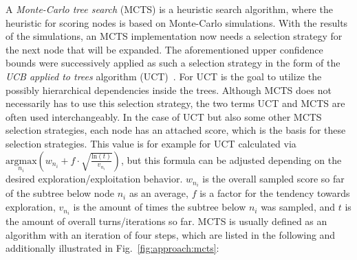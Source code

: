 A \textit{Monte-Carlo tree search} (MCTS) is a heuristic search algorithm, where the heuristic for scoring nodes is based on Monte-Carlo simulations.
With the results of the simulations, an MCTS implementation now needs a selection strategy for the next node that will be expanded.
The aforementioned upper confidence bounds were successively applied as such a selection strategy in the form of the \textit{UCB applied to trees} algorithm (UCT)~\cite{Kocsis-UCT}.
For UCT is the goal to utilize the possibly hierarchical dependencies inside the trees.
Although MCTS does not necessarily has to use this selection strategy, the two terms UCT and MCTS are often used interchangeably.\newline
In the case of UCT but also some other MCTS selection strategies, each node has an attached score, which is the basis for these selection strategies.
This value is for example for UCT calculated via $\underset{n_i}{\textrm{argmax}} \left( w_{n_i} + f \cdot \sqrt{\frac{\textrm{ln}(t)}{v_{n_i}}} \right)$, but this formula can be adjusted depending on the desired exploration/exploitation behavior.
$w_{n_i}$ is the overall sampled score so far of the subtree below node $n_i$ as an average, $f$ is a factor for the tendency towards exploration, $v_{n_i}$ is the amount of times the subtree below $n_i$ was sampled, and $t$ is the amount of overall turns/iterations so far.\newline
MCTS is usually defined as an algorithm with an iteration of four steps, which are listed in the following and additionally illustrated in Fig.~\ref{fig:approach:mcts}:
